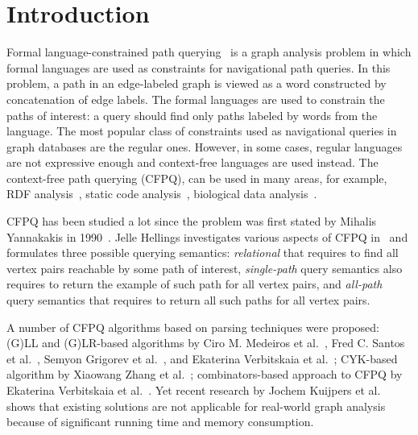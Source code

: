 \section{Introduction}

Formal language-constrained path querying~\cite{doi:10.1137/S0097539798337716} is a graph analysis problem in which formal languages are used as constraints for
navigational path queries. In this problem, a path in an edge-labeled graph is viewed
as a word constructed by concatenation of edge labels. The formal languages are used to constrain the paths of interest: a query should find only paths labeled by words from the language. The most popular class of constraints used as navigational queries in graph databases are the regular ones.
However, in some cases, regular languages are not expressive enough and context-free languages are used instead. The context-free path querying (CFPQ), can be used in many areas, for example, RDF analysis~\cite{10.1007/978-3-319-46523-4_38}, static code analysis~\cite{Zheng,10.1145/373243.360208}, biological data analysis~\cite{SubgraphQueriesbyContextfreeGrammars}.

CFPQ has been studied a lot since the problem was first stated by Mihalis Yannakakis in 1990~\cite{Yannakakis}.
Jelle Hellings investigates various aspects of CFPQ in~\cite{hellingsPathQuerying,hellingsRelational,DBLP:journals/corr/Hellings15} and formulates three possible querying semantics: \textit{relational} that requires to find all vertex pairs reachable by some path of interest, \textit{single-path} query semantics also requires to return the example of such path for all vertex pairs, and \textit{all-path} query semantics that requires to return all such paths for all vertex pairs.

A number of CFPQ algorithms based on parsing techniques were proposed: (G)LL and (G)LR-based algorithms by Ciro M. Medeiros et al.~\cite{Medeiros:2018:EEC:3167132.3167265}, Fred C. Santos et al.~\cite{10.1007/978-3-319-91662-0_17}, Semyon Grigorev et al.~\cite{Grigorev:2017:CPQ:3166094.3166104}, and Ekaterina Verbitskaia et al.~\cite{10.1007/978-3-319-41579-6_22}; CYK-based algorithm by Xiaowang Zhang et al.~\cite{10.1007/978-3-319-46523-4_38}; combinators-based approach to CFPQ by Ekaterina Verbitskaia et al.~\cite{Verbitskaia:2018:PCC:3241653.3241655}.
Yet recent research by Jochem Kuijpers et al.~\cite{Kuijpers:2019:ESC:3335783.3335791} shows that existing solutions are not applicable for real-world graph analysis because of significant
running time and memory consumption.

